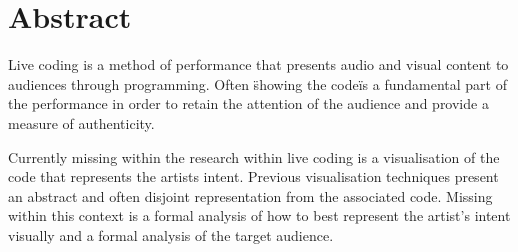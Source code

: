 
\chapter*{Abstract}
\label{cha:abstract}

Live coding is a method of performance that presents audio and visual content to audiences through programming. Often \"showing the code\" is a fundamental part of the performance in order to retain the attention of the audience and provide a measure of authenticity.




Currently missing within the research within live coding is a visualisation of the code that represents the artists intent. Previous visualisation techniques present an abstract and often disjoint representation from the associated code. Missing within this context is a formal analysis of how to best represent the artist's intent visually and a formal analysis of the target audience.


